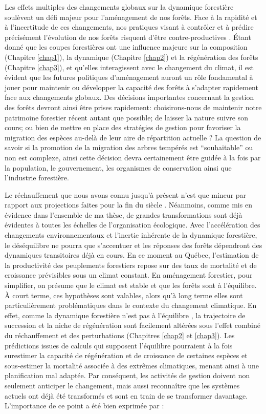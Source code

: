 Les effets multiples des changements globaux sur la dynamique forestière
soulèvent un défi majeur pour l'aménagement de nos forêts. Face à la
rapidité et à l'incertitude de ces changements, nos pratiques visant à
contrôler et à prédire précisément l'évolution de nos forêts risquent
d'être contre-productives \citep{puettmann_critique_2009}. Étant donné
que les coupes forestières ont une influence majeure sur la composition
(Chapitre \ref{chap1}), la dynamique (Chapitre \ref{chap2}) et la
régénération des forêts (Chapitre \ref{chap3}), et qu'elles
interagissent avec le changement du climat, il est évident que les
futures politiques d'aménagement auront un rôle fondamental à jouer pour
maintenir ou développer la capacité des forêts à s'adapter rapidement
face aux changements globaux. Des décisions importantes concernant la
gestion des forêts devront ainsi être prises rapidement: choisirons-nous
de maintenir notre patrimoine forestier récent autant que possible; de
laisser la nature suivre son cours; ou bien de mettre en place des
stratégies de gestion pour favoriser la migration des espèces au-delà de
leur aire de répartition actuelle \citep{frelich_will_2010}? La question
de savoir si la promotion de la migration des arbres tempérés est
``souhaitable'' ou non est complexe, ainsi cette décision devra
certainement être guidée à la fois par la population, le gouvernement,
les organismes de conservation ainsi que l'industrie forestière.

Le réchauffement que nous avons connu jusqu'à présent n'est que mineur
par rapport aux projections faites pour la fin du siècle
\citep{ipcc_climate_2014}. Néanmoins, comme mis en évidence dans
l'ensemble de ma thèse, de grandes transformations sont déjà évidentes à
toutes les échelles de l'organisation écologique. Avec l'accélération
des changements environnementaux et l'inertie inhérente de la dynamique
forestière, le déséquilibre ne pourra que s'accentuer et les réponses
des forêts dépendront des dynamiques transitoires déjà en cours. En ce
moment au Québec, l'estimation de la productivité des peuplements
forestiers repose sur des taux de mortalité et de croissance prévisibles
sous un climat constant. En aménagement forestier, pour simplifier, on
présume que le climat est stable et que les forêts sont à l'équilibre. À
court terme, ces hypothèses sont valables, alors qu'à long terme elles
sont particulièrement problématiques dans le contexte du changement
climatique. En effet, comme la dynamique forestière n'est pas à
l'équilibre \citep{talluto_extinction_2017}, la trajectoire de
succession et la niche de régénération sont facilement altérées sous
l'effet combiné du réchauffement et des perturbations (Chapitres
\ref{chap2} et \ref{chap3}). Les prédictions issues de calculs qui
supposent l'équilibre pourraient à la fois surestimer la capacité de
régénération et de croissance de certaines espèces et sous-estimer la
mortalité associée à des extrêmes climatiques, menant ainsi à une
planification mal adaptée. Par conséquent, les activités de gestion
doivent non seulement anticiper le changement, mais aussi reconnaître
que les systèmes actuels ont déjà été transformés et sont en train de se
transformer davantage. L'importance de ce point a été bien exprimée par
\citet{seastedt_management_2008} :

